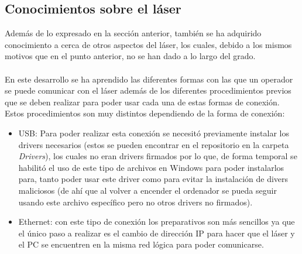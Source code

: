 \subsection{Conocimientos sobre el láser}
Además de lo expresado en la sección anterior, también se ha adquirido conocimiento a cerca de otros aspectos del láser, los cuales, debido a los mismos motivos que en el punto anterior, no se han dado a lo largo del grado.\\
\\
En este desarrollo se ha aprendido las diferentes formas con las que un operador se puede comunicar con el láser además de los diferentes procedimientos previos que se deben realizar para poder usar cada una de estas formas de conexión. Estos procedimientos son muy distintos dependiendo de la forma de conexión:
\begin{itemize}
	\item USB: Para poder realizar esta conexión se necesitó previamente instalar los drivers necesarios (estos se pueden encontrar en el repositorio en la carpeta \textit{Drivers}), los cuales no eran drivers firmados por lo que, de forma temporal se habilitó el uso de este tipo de archivos en Windows para poder instalarlos para, tanto poder usar este driver como para evitar la instalación de divers maliciosos (de ahí que al volver a encender el ordenador se pueda seguir usando este archivo específico pero no otros drivers no firmados).
	\item Ethernet: con este tipo de conexión los preparativos son más sencillos ya que el único paso a realizar es el cambio de dirección IP para hacer que el láser y el PC se encuentren en la misma red lógica para poder comunicarse.
\end{itemize}